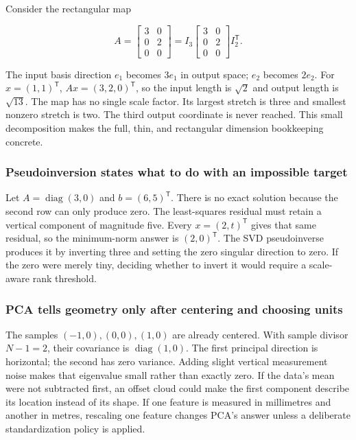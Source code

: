 Consider the rectangular map

\[
A=\begin{bmatrix}3&0\\0&2\\0&0\end{bmatrix}
=I_3\begin{bmatrix}3&0\\0&2\\0&0\end{bmatrix}I_2^\mathsf T.
\]

The input basis direction \(e_1\) becomes \(3e_1\) in output space; \(e_2\) becomes \(2e_2\). For \(x=(1,1)^\mathsf T\), \(Ax=(3,2,0)^\mathsf T\), so the input length is \(\sqrt2\) and output length is \(\sqrt{13}\). The map has no single scale factor. Its largest stretch is three and smallest nonzero stretch is two. The third output coordinate is never reached. This small decomposition makes the full, thin, and rectangular dimension bookkeeping concrete.

\subsubsection{Pseudoinversion states what to do with an impossible target}\label{pseudoinversion-states-what-to-do-with-an-impossible-target}

Let \(A=\operatorname{diag}(3,0)\) and \(b=(6,5)^\mathsf T\). There is no exact solution because the second row can only produce zero. The least-squares residual must retain a vertical component of magnitude five. Every \(x=(2,t)^\mathsf T\) gives that same residual, so the minimum-norm answer is \((2,0)^\mathsf T\). The SVD pseudoinverse produces it by inverting three and setting the zero singular direction to zero. If the zero were merely tiny, deciding whether to invert it would require a scale-aware rank threshold.

\subsubsection{PCA tells geometry only after centering and choosing units}\label{pca-tells-geometry-only-after-centering-and-choosing-units}

The samples \((-1,0),(0,0),(1,0)\) are already centered. With sample divisor \(N-1=2\), their covariance is \(\operatorname{diag}(1,0)\). The first principal direction is horizontal; the second has zero variance. Adding slight vertical measurement noise makes that eigenvalue small rather than exactly zero. If the data's mean were not subtracted first, an offset cloud could make the first component describe its location instead of its shape. If one feature is measured in millimetres and another in metres, rescaling one feature changes PCA's answer unless a deliberate standardization policy is applied.

